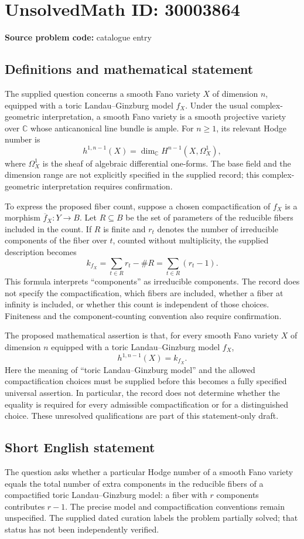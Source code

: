 \documentclass[11pt]{article}
\newcommand{\C}{\mathbb{C}}
\begin{document}
\section*{UnsolvedMath ID: 30003864}
\textbf{Source problem code:} catalogue entry
\subsection{Definitions and mathematical statement}
The supplied question concerns a smooth Fano variety \(X\) of dimension \(n\), equipped with a toric Landau--Ginzburg model \(f_X\). Under the usual complex-geometric interpretation, a smooth Fano variety is a smooth projective variety over \(\C\) whose anticanonical line bundle is ample. For \(n\geq 1\), its relevant Hodge number is
\[
h^{1,n-1}(X)=\dim_{\C}H^{n-1}(X,\Omega_X^1),
\]
where \(\Omega_X^1\) is the sheaf of algebraic differential one-forms. The base field and the dimension range are not explicitly specified in the supplied record; this complex-geometric interpretation requires confirmation.

To express the proposed fiber count, suppose a chosen compactification of \(f_X\) is a morphism \(\overline f_X\colon Y\to B\). Let \(R\subseteq B\) be the set of parameters of the reducible fibers included in the count. If \(R\) is finite and \(r_t\) denotes the number of irreducible components of the fiber over \(t\), counted without multiplicity, the supplied description becomes
\[
k_{f_X}=\sum_{t\in R}r_t-\#R
       =\sum_{t\in R}(r_t-1).
\]
This formula interprets ``components'' as irreducible components. The record does not specify the compactification, which fibers are included, whether a fiber at infinity is included, or whether this count is independent of those choices. Finiteness and the component-counting convention also require confirmation.

The proposed mathematical assertion is that, for every smooth Fano variety \(X\) of dimension \(n\) equipped with a toric Landau--Ginzburg model \(f_X\),
\[
h^{1,n-1}(X)=k_{f_X}.
\]
Here the meaning of ``toric Landau--Ginzburg model'' and the allowed compactification choices must be supplied before this becomes a fully specified universal assertion. In particular, the record does not determine whether the equality is required for every admissible compactification or for a distinguished choice. These unresolved qualifications are part of this statement-only draft.
\subsection{Short English statement}
The question asks whether a particular Hodge number of a smooth Fano variety equals the total number of extra components in the reducible fibers of a compactified toric Landau--Ginzburg model: a fiber with \(r\) components contributes \(r-1\). The precise model and compactification conventions remain unspecified. The supplied dated curation labels the problem partially solved; that status has not been independently verified.
\end{document}
